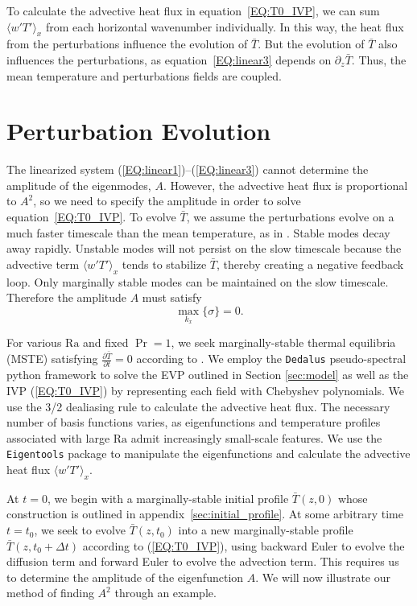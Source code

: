 \documentclass[reprint,amsmath,amssymb,aps]{revtex4-1}
\newcommand\Ra{\mathrm{Ra}}
\newcommand{\eq}[1]{(\ref{#1})}
\newcommand{\eqss}[2]{(\ref{#1})--(\ref{#2})}
\begin{document}
To calculate the advective heat flux in equation~\ref{EQ:T0_IVP}, we can sum $\langle w'T' \rangle_x$ from each horizontal wavenumber individually.
In this way, the heat flux from the perturbations influence the evolution of $\bar{T}$.
But the evolution of $\bar{T}$ also influences the perturbations, as equation~\ref{EQ:linear3} depends on $\partial_z \bar{T}$.
Thus, the mean temperature and perturbations fields are coupled.

\section{Perturbation Evolution}\label{sec:evolution}
The linearized system \eqss{EQ:linear1}{EQ:linear3} cannot determine the amplitude of the eigenmodes, $A$.
However, the advective heat flux is proportional to $A^2$, so we need to specify the amplitude in order to solve equation~\ref{EQ:T0_IVP}.
To evolve $\bar{T}$, we assume the perturbations evolve on a much faster timescale than the mean temperature, as in \cite{michel_chini_2019}.
Stable modes decay away rapidly. 
Unstable modes will not persist on the slow timescale because the advective term $\langle w'T' \rangle_x$ tends to stabilize $\bar{T}$, thereby creating a negative feedback loop.
Only marginally stable modes can be maintained on the slow timescale.
Therefore the amplitude $A$ must satisfy
\begin{equation}
    \max_{k_x} \{ \sigma \} = 0.
\end{equation}

For various $\Ra$ and fixed $\Pr = 1$, we seek marginally-stable thermal equilibria (MSTE) satisfying $\frac{\partial \bar{T}}{\partial t} = 0$ according to . 
We employ the \texttt{Dedalus} pseudo-spectral python framework \cite{Dedalus_2020} to solve the EVP outlined in Section \ref{sec:model} as well as the IVP \eq{EQ:T0_IVP} by representing each field with Chebyshev polynomials.
We use the 3/2 dealiasing rule to calculate the advective heat flux.
The necessary number of basis functions varies, as eigenfunctions and temperature profiles associated with large $\Ra$ admit increasingly small-scale features. 
We use the \texttt{Eigentools} package \cite{Eigentools} to manipulate the eigenfunctions and calculate the advective heat flux $\langle w' T' \rangle_x$.

At $t = 0$, we begin with a marginally-stable initial profile $\bar{T}(z, 0)$ whose construction is outlined in appendix~\ref{sec:initial_profile}. 
At some arbitrary time $t = t_0$, we seek to evolve $\bar{T}(z, t_0)$ into a new marginally-stable profile $\bar{T}(z, t_0 + \Delta t)$ according to \eq{EQ:T0_IVP}, using backward Euler to evolve the diffusion term and forward Euler to evolve the advection term. 
This requires us to determine the amplitude of the eigenfunction $A$.
We will now illustrate our method of finding $A^2$ through an example.
\end{document}

